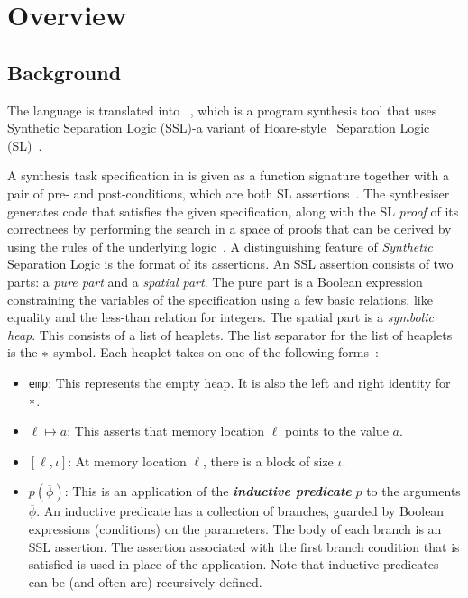 \section{Overview}
\label{sec:overview}

\subsection{Background}
The \Pika{} language is translated into
\SuSLik~\cite{polikarpova:2019:suslik}, which is a program synthesis
tool that uses Synthetic Separation Logic (SSL)-a variant of
Hoare-style~\cite{hoare:1969:axiomatic} Separation Logic
(SL)~\cite{ohearn:2001:seplogic}.


A synthesis task specification in \SuSLik{} is given as a function
signature together with a pair of pre- and post-conditions, which are
both SL assertions~\cite{polikarpova:2019:suslik}.
%
The synthesiser generates code that satisfies the given specification,
along with the SL \emph{proof} of its correctnees by performing the
search in a space of proofs that can be derived by using the rules of
the underlying logic~\cite{WatanabeGPPS21}.
%
A distinguishing feature of \textit{Synthetic} Separation Logic is the
format of its assertions. An SSL assertion consists of two parts: a
\textit{pure part} and a \textit{spatial part}. The pure part is a
Boolean expression constraining the variables of the specification
using a few basic relations, like equality and the less-than relation
for integers. The spatial part is a \textit{symbolic heap}. This
consists of a list of heaplets. The list separator for the list of
heaplets is the $*$ symbol. Each heaplet takes on one of the
following forms~\cite{polikarpova:2019:suslik}:

\begin{itemize}
  \item \texttt{emp}: This represents the empty heap. It is also the left and right identity for $*$.
  \item $\ell \mapsto a$: This asserts that memory location $\ell$ points to the value $a$.
  \item $[\ell, \iota]$: At memory location $\ell$, there is a block of size $\iota$.
  \item $p(\overline{\phi})$: This is an application of the
    \textbf{\textit{inductive predicate}} $p$ to the arguments
    $\overline{\phi}$. An inductive predicate has a collection of
    branches, guarded by Boolean expressions (conditions) on the
    parameters. The body of each branch is an SSL assertion. The
    assertion associated with the first branch condition that is
    satisfied is used in place of the application. Note that inductive
    predicates can be (and often are) recursively defined.
\end{itemize}

